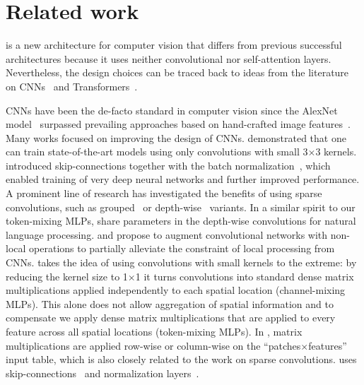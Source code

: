 \section{Related work}

\fullname{} is a new architecture for computer vision that differs from previous successful architectures because it uses neither convolutional nor self-attention layers. Nevertheless, the design choices can be traced back to ideas from the literature on  CNNs~\cite{KrizhevskyNIPS12,LeCun1989BackpropagationAT} and Transformers~\cite{vaswani2017}.

CNNs have been the de-facto standard in computer vision since the AlexNet model~\cite{KrizhevskyNIPS12} surpassed prevailing approaches based on hand-crafted image features~\cite{pinz2006object}.
Many works focused on improving the design of CNNs. 
\citet{simonyan2014very} demonstrated that one can train state-of-the-art models using only convolutions with small 3$\times$3 kernels.
\citet{he2016deep} introduced skip-connections together with the batch normalization~\cite{ioffe2015batch}, which enabled training of very deep neural networks 
and further improved performance.
A prominent line of research has investigated the benefits of using sparse convolutions, such as grouped~\cite{Xie2016} or depth-wise~\cite{chollet2017xception,howard2017mobilenets} variants. 
In a similar spirit to our token-mixing MLPs, \citet{wu2019lightcnn} share parameters in the depth-wise convolutions for natural language processing.
\citet{hu2018squeeze} and \citet{wang2018-nonlocalnn} propose to augment convolutional networks with non-local operations to partially alleviate the constraint of local processing from CNNs.
\name{} takes the idea of using convolutions with small kernels to the extreme: by reducing the kernel size to 1$\times$1 it 
turns convolutions into standard dense matrix multiplications applied independently to each spatial location (channel-mixing MLPs).
This 
alone does not allow aggregation of spatial information and to compensate we apply dense matrix multiplications that are applied to every feature across all spatial locations (token-mixing MLPs). 
In \name{}, matrix multiplications are applied row-wise or column-wise on the ``patches$\times$features'' input table, which is also closely related to the work on sparse convolutions. 
\name{} uses skip-connections~\cite{he2016deep} and normalization layers~\cite{ba2016layer,ioffe2015batch}.

